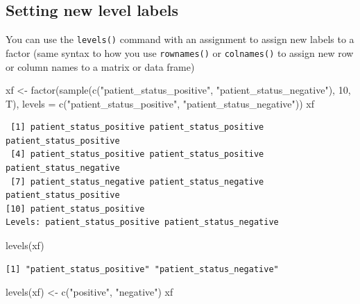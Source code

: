 \documentclass[
]{book}
\newenvironment{Shaded}{\begin{snugshade}}{\end{snugshade}}
\newcommand{\AttributeTok}[1]{\textcolor[rgb]{0.77,0.63,0.00}{#1}}
\newcommand{\DecValTok}[1]{\textcolor[rgb]{0.00,0.00,0.81}{#1}}
\newcommand{\FunctionTok}[1]{\textcolor[rgb]{0.00,0.00,0.00}{#1}}
\newcommand{\NormalTok}[1]{#1}
\newcommand{\OtherTok}[1]{\textcolor[rgb]{0.56,0.35,0.01}{#1}}
\newcommand{\StringTok}[1]{\textcolor[rgb]{0.31,0.60,0.02}{#1}}
\begin{document}
\hypertarget{setting-new-level-labels}{%
\subsection{Setting new level labels}\label{setting-new-level-labels}}

You can use the \texttt{levels()} command with an assignment to assign new labels to a factor (same syntax to how you use \texttt{rownames()} or \texttt{colnames()} to assign new row or column names to a matrix or data frame)

\begin{Shaded}
\begin{Highlighting}[]
\NormalTok{xf }\OtherTok{\textless{}{-}} \FunctionTok{factor}\NormalTok{(}\FunctionTok{sample}\NormalTok{(}\FunctionTok{c}\NormalTok{(}\StringTok{"patient\_status\_positive"}\NormalTok{, }\StringTok{"patient\_status\_negative"}\NormalTok{), }\DecValTok{10}\NormalTok{, T),}
             \AttributeTok{levels =} \FunctionTok{c}\NormalTok{(}\StringTok{"patient\_status\_positive"}\NormalTok{, }\StringTok{"patient\_status\_negative"}\NormalTok{))}
\NormalTok{xf}
\end{Highlighting}
\end{Shaded}

\begin{verbatim}
 [1] patient_status_positive patient_status_positive patient_status_positive
 [4] patient_status_positive patient_status_positive patient_status_negative
 [7] patient_status_negative patient_status_negative patient_status_positive
[10] patient_status_positive
Levels: patient_status_positive patient_status_negative
\end{verbatim}

\begin{Shaded}
\begin{Highlighting}[]
\FunctionTok{levels}\NormalTok{(xf)}
\end{Highlighting}
\end{Shaded}

\begin{verbatim}
[1] "patient_status_positive" "patient_status_negative"
\end{verbatim}

\begin{Shaded}
\begin{Highlighting}[]
\FunctionTok{levels}\NormalTok{(xf) }\OtherTok{\textless{}{-}} \FunctionTok{c}\NormalTok{(}\StringTok{"positive"}\NormalTok{, }\StringTok{"negative"}\NormalTok{)}
\NormalTok{xf}
\end{Highlighting}
\end{Shaded}
\end{document}
